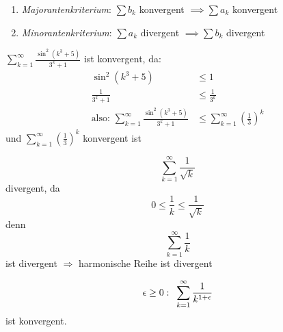 \begin{enumerate}
    \item \emph{Majorantenkriterium}: $\sum b_k$ konvergent $\implies \sum a_k$ konvergent
    \item \emph{Minorantenkriterium}: $\sum a_k$ divergent $\implies \sum b_k$ divergent
\end{enumerate}

\begin{example}[Konvergenz]
    $ \sum_{k=1}^{\infty} \frac{\sin^2 \left( k^3 + 5 \right) }{3^k + 1} $ ist konvergent, da:
    \begin{align*}
        \sin^2 \left(k^3 + 5 \right) &\leq 1 \\
        \frac{1}{3^k+1} &\leq \frac{1}{3^k} \\
        \text{also: } \sum_{k=1}^{\infty} \frac{\sin^2 \left( k^3 + 5 \right) }{3^k + 1} &\leq \sum_{k=1}^{\infty} \left( \frac{1}{3} \right)^k
    \end{align*}
    und $\sum_{k=1}^{\infty} \left( \frac{1}{3} \right)^k$ konvergent ist
\end{example}

\begin{example}[Divergenz]
    \begin{equation*} \sum_{k=1}^{\infty} \frac{1}{\sqrt{k}} \end{equation*} divergent, da \begin{equation*} 0 \leq \frac{1}{k} \leq \frac{1}{\sqrt{k}} \end{equation*}
    denn \begin{equation*}\sum_{k=1}^{\infty} \frac{1}{k}\end{equation*} ist divergent $\Rightarrow$ harmonische Reihe ist divergent
\end{example}

\begin{note}
    \begin{equation*}
        \epsilon \ge 0: \hspace{5px} \sum_{k=1}^{\infty} \frac{1}{k^{1+\epsilon}}
    \end{equation*}
    ist konvergent.
\end{note}

